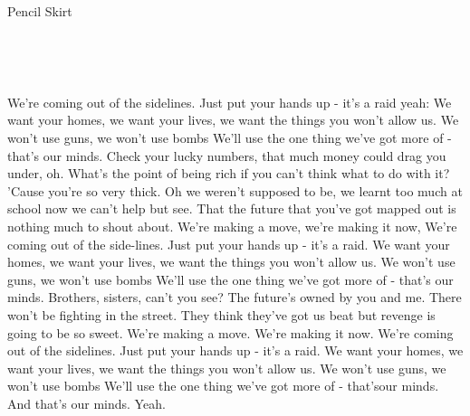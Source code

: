 \begin{song}{Pencil Skirt}{
	

	\mbox{ \CMaj \AMaj \DMaj \GMaj }


	\mbox{ \EmShAm \CMajShE }
	
}
\begin{SongVerse}
		We're coming out of the sidelines. 
		Just put your hands up - it's a raid yeah: 
		We want your homes, we want your lives, 
		we want the things you won't allow us. 
		We won't use guns, we won't use bombs
		We'll use the one thing we've got more of - that's our minds. 
		Check your lucky numbers, that much money could drag you under, oh. 
		What's the point of being rich if you can't think what to do with it? 
		'Cause you're so very thick. 
		Oh we weren't supposed to be, we learnt too much at school now 
		we can't help but see. 
		That the future that you've got mapped out is nothing much to shout about. 
		We're making a move, we're making it now,
		We're coming out of the side-lines. 
		Just put your hands up - it's a raid. 
		We want your homes, we want your lives,
		we want the things you won't allow us. 
		We won't use guns, we won't use bombs
		We'll use the one thing we've got more of - that's our minds. 
		Brothers, sisters, can't you see? 
		The future's owned by you and me. 
		There won't be fighting in the street. 
		They think they've got us beat but revenge is going to be so sweet. 
		We're making a move. We're making it now. 
		We're coming out of the sidelines. 
		Just put your hands up - it's a raid. 
		We want your homes, we want your lives, 
		we want the things you won't allow us. 
		We won't use guns, we won't use bombs
		We'll use the one thing we've got more of - that'sour minds. 
		And that's our minds. Yeah. 
	 \end{SongVerse}

\end{song}